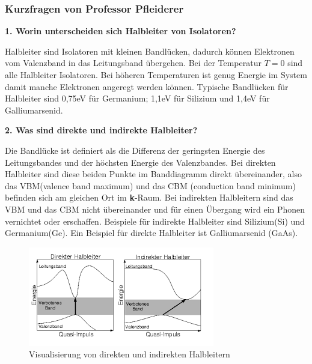 \subsubsection{Kurzfragen von Professor Pfleiderer}
\noindent\textbf{1. Worin unterscheiden sich Halbleiter von Isolatoren?}\\
\begin{addmargin}[25pt]{0pt}
Halbleiter sind Isolatoren mit kleinen Bandlücken, dadurch können Elektronen vom Valenzband in das Leitungsband übergehen. Bei der Temperatur $T=0$ sind alle Halbleiter Isolatoren. Bei höheren Temperaturen ist genug Energie im System damit manche Elektronen angeregt werden können. Typische Bandlücken für Halbleiter sind 0,75eV für Germanium; 1,1eV für Silizium und 1,4eV für Galliumarsenid. \\
\end{addmargin}

\noindent\textbf{2. Was sind direkte und indirekte Halbleiter?}\\
\begin{addmargin}[25pt]{0pt}
Die Bandlücke ist definiert als die Differenz der geringsten Energie des Leitungsbandes und der höchsten Energie des Valenzbandes. Bei direkten Halbleiter sind diese beiden Punkte im Banddiagramm direkt übereinander, also das VBM(valence band maximum) und das CBM (conduction band minimum) befinden sich am gleichen Ort im \textbf{k}-Raum. Bei indirekten Halbleitern sind das VBM und das CBM nicht übereinander und für einen Übergang wird ein Phonen vernichtet oder erschaffen. Beispiele für indirekte Halbleiter sind Silizium(Si) und Germanium(Ge). Ein Beispiel für direkte Halbleiter ist Galliumarsenid (GaAs).

\begin{figure}[h]
    \centering
    \includegraphics{images/KM2/direkt_indirekt_HL.png}
    \caption{Visualisierung von direkten und indirekten Halbleitern}
    \label{fig:direkte_indirekte_Halbleiter}
\end{figure}
\end{addmargin}

